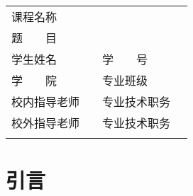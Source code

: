 \documentclass[a4paper, 11pt]{ctexart}
\begin{document}
\begin{titlepage}

    \begin{center}
    \end{center}

    \begin{table}[!b]
        \fontsize{14pt}{0}\selectfont
        \begin{tabularx}{\textwidth}{lXlX}
            \rule{0pt}{36pt}
            课程名称     & \multicolumn{3}{l}{}                        \\
            \cline{2-4}
            \rule{0pt}{36pt}
            题　　目     & \multicolumn{3}{l}{}                        \\
            \cline{2-4}
            \rule{0pt}{36pt}
            学生姓名     &                      & \quad 学　　号     & \\
            \cline{2-2} \cline{4-4}
            \rule{0pt}{36pt}
            学　　院     &                      & \quad 专业班级     & \\
            \cline{2-2} \cline{4-4}
            \rule{0pt}{36pt}
            校内指导老师 &                      & \quad 专业技术职务 & \\
            \cline{2-2} \cline{4-4}
            \rule{0pt}{36pt}
            校外指导老师 &                      & \quad 专业技术职务 & \\
            \cline{2-2} \cline{4-4}
            \rule{0pt}{36pt}
        \end{tabularx}
    \end{table}

\end{titlepage}

\clearpage
\phantom{s}
\thispagestyle{empty}

\clearpage
\tableofcontents
\thispagestyle{empty} %

\clearpage
\phantom{s}
\thispagestyle{empty}

\clearpage
\setcounter{page}{1} %
\section{引言}
\end{document}
